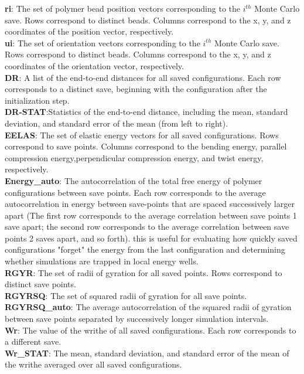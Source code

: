 \documentclass[english]{article}
\begin{document}
\textbf{ri}: The set of polymer bead position vectors corresponding to the $i^{th}$ Monte Carlo save. Rows correspond to distinct beads. Columns correspond to the x, y, and z coordinates of the position vector, respectively.\\
\textbf{ui}: The set of orientation vectors corresponding to the  $i^{th}$ Monte Carlo save. Rows correspond to distinct beads. Columns correspond to the x, y, and z coordinates of the orientation vector, respectively.\\
\textbf{DR}: A list of the end-to-end distances for all saved configurations. Each row corresponds to a distinct save, beginning with the configuration after the initialization step.\\
\textbf{DR-STAT}:Statistics of the end-to-end distance, including the mean, standard deviation, and standard error of the mean (from left to right).\\
\textbf{EELAS}: The set of elastic energy vectors for all saved configurations. Rows correspond to save points. Columns correspond to the bending energy, parallel compression energy,perpendicular compression energy, and twist energy, respectively.\\
\textbf{Energy_auto}: The autocorrelation of the total free energy of polymer configurations between save points. Each row corresponds to the average autocorrelation in energy between save-points that are spaced successively larger apart (The first row corresponds to the average correlation between save points 1 save apart; the second row corresponds to the average correlation between save points 2 saves apart, and so forth). this is useful for evaluating how quickly saved configurations "forget" the energy from the last configuration and determining whether simulations are trapped in local energy wells.\\
\textbf{RGYR}: The set of radii of gyration for all saved points. Rows correspond to distinct save points.\\
\textbf{RGYRSQ}: The set of squared radii of gyration for all save points.\\
\textbf{RGYRSQ_auto}: The average autocorrelation of the squared radii of gyration between save points separated by successively longer simulation intervals.\\
\textbf{Wr}: The value of the writhe of all saved configurations. Each row corresponds to a different save.\\
\textbf{Wr_STAT}: The mean, standard deviation, and standard error of the mean of the writhe averaged over all saved configurations.\\
\end{document}
